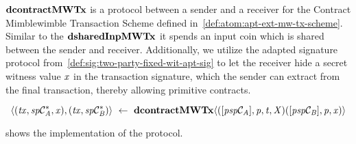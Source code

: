 $\mathbf{dcontractMWTx}$ is a protocol between a sender and a receiver for the Contract Mimblewimble Transaction Scheme defined in~\cref{def:atom:apt-ext-mw-tx-scheme}.
Similar to the $\mathbf{dsharedInpMWTx}$ it spends an input coin which is shared between the sender and receiver.
Additionally, we utilize the adapted signature protocol from~\cref{def:sig:two-party-fixed-wit-apt-sig} to let the receiver hide a secret witness value $\mathit{x}$ in the transaction signature, which the sender can extract from the final transaction, thereby allowing primitive contracts.

\[ \langle (\mathit{tx}, \mathit{sp}\mathcal{C}_{\mathit{A}}^*, \mathit{x}), (\mathit{tx}, \mathit{sp}\mathcal{C}_{\mathit{B}}^*) \rangle ~\leftarrow~ \mathbf{dcontractMWTx} \langle([\mathit{psp}\mathcal{C}_{\mathit{A}}],\mathit{p},\mathit{t},\mathit{X}) ([\mathit{psp}\mathcal{C}_{\mathit{B}}],\mathit{p},\mathit{x}) \rangle \]

 shows the implementation of the protocol.

